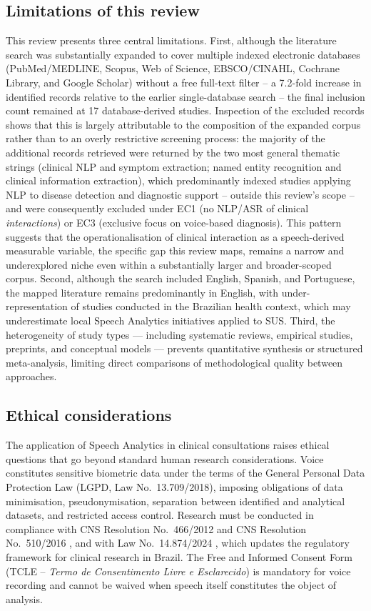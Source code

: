 \documentclass[review,12pt]{elsarticle}
\begin{document}
\subsection*{Limitations of this review}

This review presents three central limitations.
First, although the literature search was substantially expanded to cover
multiple indexed electronic databases (PubMed/MEDLINE, Scopus, Web of
Science, EBSCO/CINAHL, Cochrane Library, and Google Scholar) without a
free full-text filter -- a 7.2-fold increase in identified records relative
to the earlier single-database search -- the final inclusion count remained
at 17 database-derived studies. Inspection of the excluded records shows
that this is largely attributable to the composition of the expanded
corpus rather than to an overly restrictive screening process: the
majority of the additional records retrieved were returned by the two most
general thematic strings (clinical NLP and symptom extraction; named
entity recognition and clinical information extraction), which
predominantly indexed studies applying NLP to disease detection and
diagnostic support -- outside this review's scope -- and were
consequently excluded under EC1 (no NLP/ASR of clinical
\emph{interactions}) or EC3 (exclusive focus on voice-based diagnosis).
This pattern suggests that the operationalisation of clinical interaction
as a speech-derived measurable variable, the specific gap this review
maps, remains a narrow and underexplored niche even within a
substantially larger and broader-scoped corpus.
Second, although the search included English, Spanish, and Portuguese, the
mapped literature remains predominantly in English, with under-representation
of studies conducted in the Brazilian health context, which may underestimate
local Speech Analytics initiatives applied to SUS.
Third, the heterogeneity of study types --- including systematic reviews,
empirical studies, preprints, and conceptual models --- prevents quantitative
synthesis or structured meta-analysis, limiting direct comparisons of
methodological quality between approaches.

\subsection*{Ethical considerations}

The application of Speech Analytics in clinical consultations raises ethical
questions that go beyond standard human research considerations.
Voice constitutes sensitive biometric data under the terms of the General
Personal Data Protection Law (LGPD, Law No.~13.709/2018), imposing
obligations of data minimisation, pseudonymisation, separation between
identified and analytical datasets, and restricted access control.
Research must be conducted in compliance with CNS Resolution
No.~466/2012 \citep{CNS466_2012} and CNS Resolution No.~510/2016
\citep{CNS510_2016}, and with Law No.~14.874/2024 \citep{Lei14874_2024},
which updates the regulatory framework for clinical research in Brazil.
The Free and Informed Consent Form (TCLE -- \textit{Termo de Consentimento
Livre e Esclarecido}) is mandatory for voice recording and cannot be waived
when speech itself constitutes the object of analysis.
\end{document}
